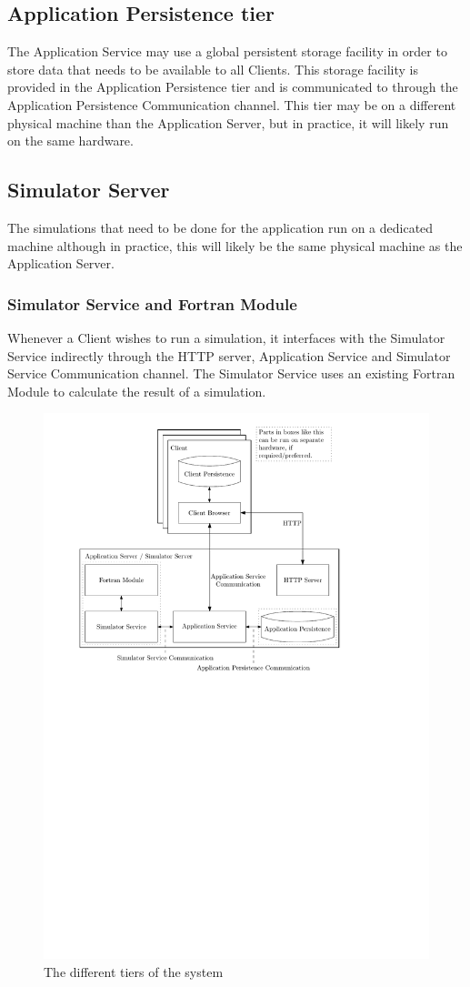 \subsection{Application Persistence tier}
\label{sec:applicationpersistence}
The Application Service may use a global persistent storage facility in order to store data that needs to be available to all Clients. This storage facility is provided in the Application Persistence tier and is communicated to through the Application Persistence Communication channel. This tier may be on a different physical machine than the Application Server, but in practice, it will likely run on the same hardware.

\subsection{Simulator Server}
\label{sec:simulatorserver}
The simulations that need to be done for the application run on a dedicated machine although in practice, this will likely be the same physical machine as the Application Server.

\subsubsection{Simulator Service and Fortran Module}
\label{sec:simulatorservice}
Whenever a Client wishes to run a simulation, it interfaces with the Simulator Service indirectly through the HTTP server, Application Service and Simulator Service Communication channel. The Simulator Service uses an existing Fortran Module to calculate the result of a simulation.

\begin{figure}
	\centering
	\includegraphics{SoftwareTiers}
	\caption{The different tiers of the system}
	\label{fig:tierchannel}
\end{figure}
